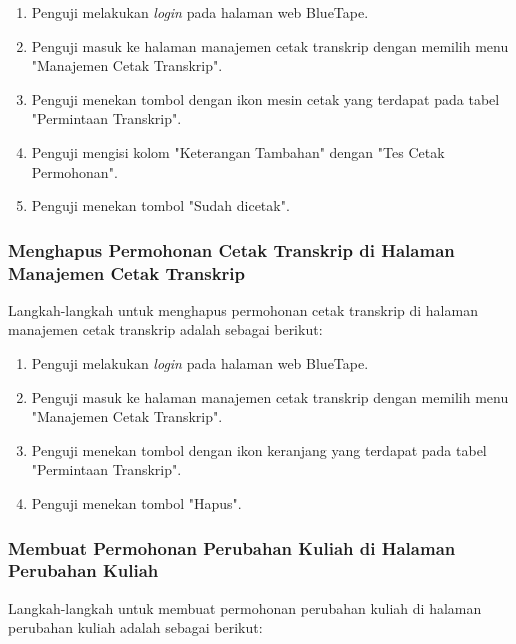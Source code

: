 \begin{enumerate}
    \item Penguji melakukan \textit{login} pada halaman web BlueTape.
    \item Penguji masuk ke halaman manajemen cetak transkrip dengan memilih menu "Manajemen Cetak Transkrip".
    \item Penguji menekan tombol dengan ikon mesin cetak yang terdapat pada tabel "Permintaan Transkrip".
    \item Penguji mengisi kolom "Keterangan Tambahan" dengan "Tes Cetak Permohonan".
    \item Penguji menekan tombol "Sudah dicetak".
\end{enumerate}

\subsubsection{Menghapus Permohonan Cetak Transkrip di Halaman Manajemen Cetak Transkrip}
\label{subsubsec:skenario_menghapus_permohonan_cetak_transkrip_di_halaman_manajemen_cetak_transkrip}
Langkah-langkah untuk menghapus permohonan cetak transkrip di halaman manajemen cetak transkrip adalah sebagai berikut:

\begin{enumerate}
    \item Penguji melakukan \textit{login} pada halaman web BlueTape.
    \item Penguji masuk ke halaman manajemen cetak transkrip dengan memilih menu "Manajemen Cetak Transkrip".
    \item Penguji menekan tombol dengan ikon keranjang yang terdapat pada tabel "Permintaan Transkrip".
    \item Penguji menekan tombol "Hapus".
\end{enumerate}

\subsubsection{Membuat Permohonan Perubahan Kuliah di Halaman Perubahan Kuliah}
\label{subsubsec:skenario_membuat_permohonan_perubahan_kuliah_di_halaman_perubahan_kuliah}
Langkah-langkah untuk membuat permohonan perubahan kuliah di halaman perubahan kuliah adalah sebagai berikut:


